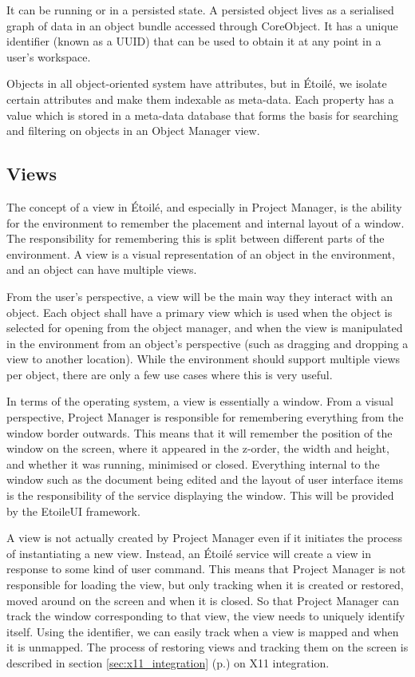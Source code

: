 \documentclass[11pt]{report}
\newcommand{\etoile}{\'Etoil\'e\xspace}
\newcommand{\proman}{Project Manager\xspace}
\begin{document}
It can be running or in a persisted state. A persisted object lives as a serialised graph of data in an object bundle accessed through CoreObject. It has a unique identifier (known as a UUID) that can be used to obtain it at any point in a user's workspace.

Objects in all object-oriented system have attributes, but in \etoile, we isolate certain attributes and make them indexable as meta-data. Each property has a value which is stored in a meta-data database that forms the basis for searching and filtering on objects in an Object Manager view.

\subsection{Views}
The concept of a view in \etoile, and especially in Project Manager, is the ability for the environment to remember the placement and internal layout of a window. The responsibility for remembering this is split between different parts of the environment. A view is a visual representation of an object in the environment, and an object can have multiple views.

From the user's perspective, a view will be the main way they interact with an object. Each object shall have a primary view which is used when the object is selected for opening from the object manager, and when the view is manipulated in the environment from an object's perspective (such as dragging and dropping a view to another location). While the environment should support multiple views per object, there are only a few use cases where this is very useful.

In terms of the operating system, a view is essentially a window. From a visual perspective, \proman is responsible for remembering everything from the window border outwards. This means that it will remember the position of the window on the screen, where it appeared in the z-order, the width and height, and whether it was running, minimised or closed. Everything internal to the window such as the document being edited and the layout of user interface items is the responsibility of the service displaying the window. This will be provided by the EtoileUI framework.

A view is not actually created by \proman even if it initiates the process of instantiating a new view. Instead, an \etoile service will create a view in response to some kind of user command. This means that \proman is not responsible for loading the view, but only tracking when it is created or restored, moved around on the screen and when it is closed. So that \proman can track the window corresponding to that view, the view needs to uniquely identify itself. Using the identifier, we can easily track when a view is mapped and when it is unmapped. The process of restoring views and tracking them on the screen is described in section \ref{sec:x11_integration} (p.\pageref{sec:x11_integration}) on X11 integration.
\end{document}
